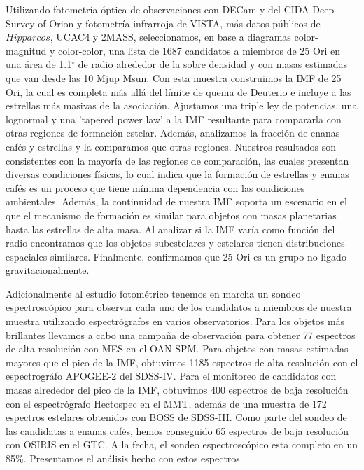 \documentclass[12pt]{article}
\begin{document}
Utilizando fotometr\'ia \'optica de observaciones con DECam y del CIDA Deep Survey of Orion y fotometr\'ia infrarroja de VISTA, m\'as datos p\'ublicos de $Hipparcos$, UCAC4 y 2MASS, seleccionamos, en base a diagramas color-magnitud y color-color, una lista de 1687 candidatos a miembros de 25 Ori en una \'area de 1.1$^\circ$ de radio alrededor de la sobre densidad y con masas estimadas que van desde las 10 \ac{Mjup} \ac{Msun}. Con esta muestra construimos la IMF de 25 Ori, la cual es completa m\'as all\'a del l\'imite de quema de Deuterio e incluye a las estrellas m\'as masivas de la asociaci\'on. Ajustamos una triple ley de potencias, una lognormal y una 'tapered power law' a la IMF resultante para compararla con otras regiones de formaci\'on estelar. Adem\'as, analizamos la fracci\'on de enanas caf\'es y estrellas y la comparamos que otras regiones. Nuestros resultados son consistentes con la mayor\'ia de las regiones de comparaci\'on, las cuales presentan diversas condiciones f\'isicas, lo cual indica que la formaci\'on de estrellas y enanas caf\'es es un proceso que tiene m\'inima dependencia con las condiciones ambientales. Adem\'as, la continuidad de nuestra IMF soporta un escenario en el que el mecanismo de formaci\'on es similar para objetos con masas planetarias hasta las estrellas de alta masa. Al analizar si la IMF var\'ia como funci\'on del radio encontramos que los objetos subestelares y estelares tienen distribuciones espaciales similares. Finalmente, confirmamos que 25 Ori es un grupo no ligado gravitacionalmente.

Adicionalmente al estudio fotom\'etrico tenemos en marcha un sondeo espectrosc\'opico para observar cada uno de los candidatos a miembros de nuestra muestra utilizando espectr\'ografos en varios observatorios. Para los objetos m\'as brillantes llevamos a cabo una campa\~na de observaci\'on para obtener 77 espectros de alta resoluci\'on con MES en el OAN-SPM. Para objetos con masas estimadas mayores que el pico de la IMF, obtuvimos 1185 espectros de alta resoluci\'on con el espectrogr\'afo APOGEE-2 del SDSS-IV. Para el monitoreo de candidatos con masas alrededor del pico de la IMF, obtuvimos 400 espectros de baja resoluci\'on con el espectr\'ografo Hectospec en el MMT, adem\'as de una muestra de 172 espectros estelares obtenidos con BOSS de SDSS-III. Como parte del sondeo de las candidatas a enanas caf\'es, hemos conseguido 65 espectros de baja resoluci\'on con OSIRIS en el GTC. A la fecha, el sondeo espectrosc\'opico esta completo en un 85\%. Presentamos el an\'alisis hecho con estos espectros.
\end{document}
